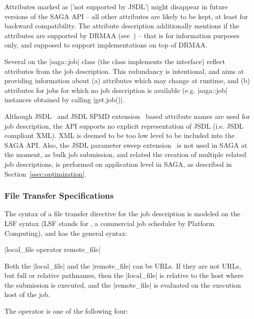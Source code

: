     Attributes marked as |'not supported by JSDL'| might
    disappear in future versions of the SAGA API -- all other
    attributes are likely to be kept, at least for backward
    compatibility.  The attribute description additionally
    mentions if the attributes are supported by DRMAA
    (see~\cite{drmaa-spec}) -- that is for information purposes
    only, and supposed to support implementations on top of
    DRMAA.
 
    Several  on the |saga::job| class (the class
    implements the  interface) reflect
    attributes from the job description.  This redundancy is
    intentional, and aims at providing information about (a)
    attributes which may change at runtime, and (b) attributes
    for jobs for which no job description is available (e.g.
    |saga::job| instances obtained by calling |get.job()|.
 
    Although JSDL~\cite{jsdl-spec} and JSDL SPMD
    extension~\cite{jsdl-spmd} based attribute names are used
    for job description, the API supports no explicit
    representation of JSDL (i.e.  JSDL compliant XML).  XML is
    deemed to be too low level to be included into the SAGA API.
    Also, the JSDL parameter sweep
    extension~\cite{jsdl-paramsweep} is not used in SAGA at the
    moment, as bulk job submission, and related the creation of
    multiple related job descriptions, is performed on
    application level in SAGA, as described in
    Section~\ref{ssec:optimization}.
    
  \subsubsection{File Transfer Specifications}
  
  The syntax of a file transfer directive for the job
  description is modeled on the LSF syntax (LSF stands for
  , a commercial job scheduler by
  Platform Computing), and has the general syntax:
 
    \shift |local_file operator remote_file|
 
    Both the |local_file| and the |remote_file| can be URLs. If
    they are not URLs, but full or relative pathnames, then the
    |local_file| is relative to the host where the submission is
    executed, and the |remote_file| is evaluated on the
    execution host of the job.
 
    The operator is one of the following four:
 
